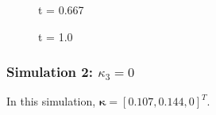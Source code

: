 \documentclass[paper=a4, fontsize=11pt]{scrartcl} %
\numberwithin{equation}{section} %
\numberwithin{figure}{section} %
\numberwithin{table}{section} %
\begin{document}
    \begin{figure}[h!]
        \caption{t = 0.667}
        \label{fig:frame1_67}
    \end{figure}
    \begin{figure}[h!]
        \caption{t = 1.0}
        \label{fig:frame1_100}
    \end{figure}

\subsubsection{Simulation 2: $\kappa_3 = 0$}
In this simulation, $\bm{\kappa} = [0.107, 0.144, 0 ]^T$.
\end{document}
